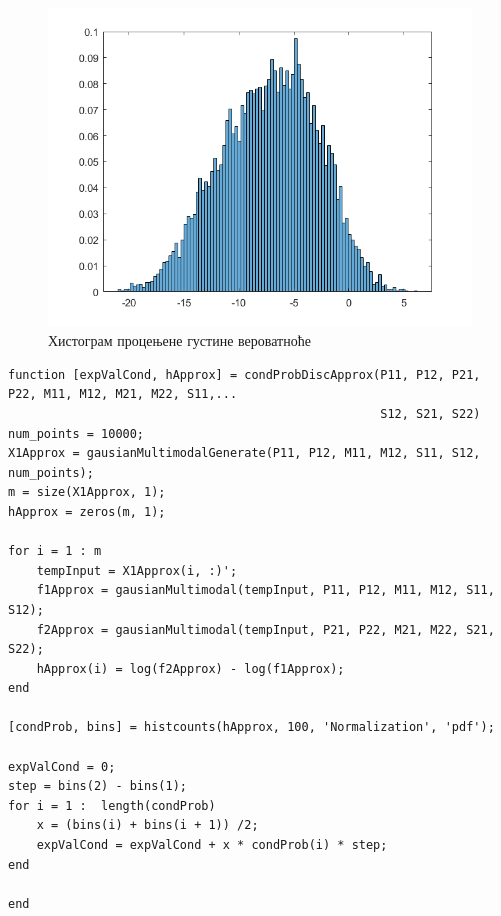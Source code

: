 \begin{figure}[htb!]
\centering
\includegraphics[scale=1]{pictures/2/histogram}
\caption{Хистограм процењене густине вероватноће}\label{fig:WaldoHisto}
\end{figure}


\begin{lstlisting}[caption={Процена условног h},label={fun:estH}]
function [expValCond, hApprox] = condProbDiscApprox(P11, P12, P21, P22, M11, M12, M21, M22, S11,...
                                                    S12, S21, S22)
num_points = 10000;
X1Approx = gausianMultimodalGenerate(P11, P12, M11, M12, S11, S12, num_points);
m = size(X1Approx, 1);
hApprox = zeros(m, 1);

for i = 1 : m
    tempInput = X1Approx(i, :)';
    f1Approx = gausianMultimodal(tempInput, P11, P12, M11, M12, S11, S12);
    f2Approx = gausianMultimodal(tempInput, P21, P22, M21, M22, S21, S22);
    hApprox(i) = log(f2Approx) - log(f1Approx);
end

[condProb, bins] = histcounts(hApprox, 100, 'Normalization', 'pdf');

expValCond = 0;
step = bins(2) - bins(1);
for i = 1 :  length(condProb)
    x = (bins(i) + bins(i + 1)) /2;
    expValCond = expValCond + x * condProb(i) * step;
end

end

\end{lstlisting}


